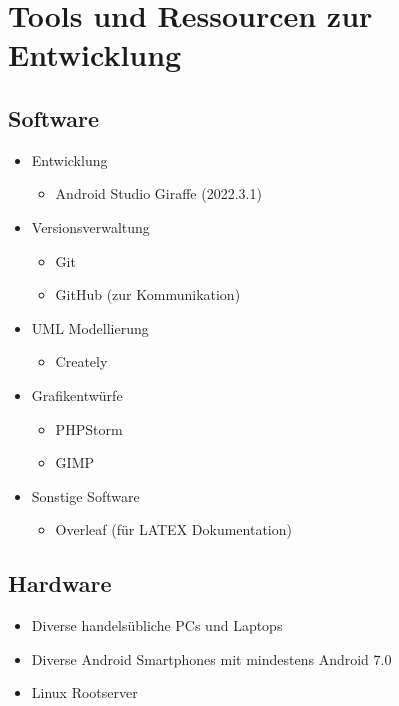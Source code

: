 \documentclass[oneside, ngerman]{sdqtechreport}
\begin{document}
\chapter{Tools und Ressourcen zur Entwicklung}
\label{chap:Entwicklungsumgebung}

\section{Software}
\label{sec:Entwicklungsumgebung:Software}

\begin{itemize}
    \item Entwicklung
    \begin{itemize}
        \item Android Studio Giraffe (2022.3.1)
    \end{itemize}
    
    \item Versionsverwaltung
    \begin{itemize}
        \item Git
        \item GitHub (zur Kommunikation)
    \end{itemize}

    \item UML Modellierung
    \begin{itemize}
        \item Creately
    \end{itemize}

    \item Grafikentwürfe
    \begin{itemize}
        \item PHPStorm
        \item GIMP
    \end{itemize}

    \item Sonstige Software
    \begin{itemize}
        \item Overleaf (für LATEX Dokumentation)
    \end{itemize}
    
\end{itemize}

\section{Hardware}
\label{sec:Entwicklungsumgebung:Hardware}

\begin{itemize}
    \item Diverse handelsübliche PCs und Laptops
    \item Diverse Android Smartphones mit mindestens Android 7.0
    \item Linux Rootserver
\end{itemize}
\end{document}
